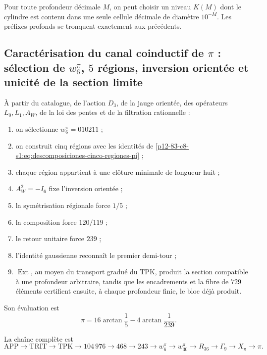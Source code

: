 Pour toute profondeur décimale \(M\), on peut choisir un niveau \(K(M)\) dont le
cylindre est contenu dans une seule cellule décimale de diamètre \(10^{-M}\).
Les préfixes profonds se tronquent exactement aux précédents.

\subsection{Caractérisation du canal coinductif de \(\pi\) : sélection de \(w_6^\pi\), \(5\) régions, inversion orientée et unicité de la section limite}

\begin{theorem}
\label{p12-83-c8-s1:thm:caracterizacion-final-pi-autonoma}
À partir du catalogue, de l’action \(D_3\), de la jauge orientée, des
opérateurs \(L_0,L_1,A_W\), de la loi des pentes et de la filtration rationnelle :
\begin{enumerate}
 \item on sélectionne \(w_6^\pi=010211\) ;
 \item on construit cinq régions avec les identités de
       \eqref{p12-83-c8-s1:eq:descomposiciones-cinco-regiones-pi} ;
 \item chaque région appartient à une clôture minimale de longueur huit ;
 \item \(A_W^2=-I_6\) fixe l’inversion orientée ;
 \item la symétrisation régionale force \(1/5\) ;
 \item la composition force \(120/119\) ;
 \item le retour unitaire force \(239\) ;
 \item l’identité gaussienne reconnaît le premier demi-tour ;
 \item \(\operatorname{Ext}\), au moyen du transport gradué du TPK,
       produit la section compatible à une profondeur arbitraire, tandis que les
       encadrements et la fibre de \(729\) éléments certifient ensuite, à chaque
       profondeur finie, le bloc déjà produit.
\end{enumerate}
Son évaluation est
\[
 \boxed{\pi=16\arctan\frac15-4\arctan\frac1{239}.}
\]
\end{theorem}

La chaîne complète est
\[
 \mathrm{APP}\to\mathrm{TRIT}\to\mathrm{TPK}
 \to104\,976\to468\to243\to w_6^\pi
 \to w_{30}^\pi\to R_{36}\to\Gamma_9
 \to X_\pi\to\pi.
\]

